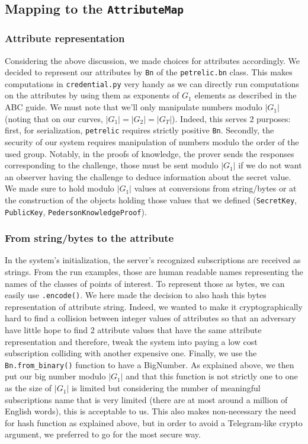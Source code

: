 \documentclass[10pt,conference,compsocconf]{IEEEtran}
\begin{document}
\subsection{Mapping to the \texttt{AttributeMap}}
\subsubsection{Attribute representation}
Considering the above discussion, we made choices for attributes accordingly. We decided to represent our attributes by \texttt{Bn} of the \texttt{petrelic.bn} class. This makes computations in \texttt{credential.py} very handy as we can directly run computations on the attributes by using them as exponents of $G_1$ elements as described in the ABC guide. We must note that we'll only manipulate numbers modulo $|G_1|$ (noting that on our curves, $|G_1|=|G_2|=|G_T|$). Indeed, this serves 2 purposes: first, for serialization, \texttt{petrelic} requires strictly positive \texttt{Bn}. Secondly, the security of our system requires manipulation of numbers modulo the order of the used group. Notably, in the proofs of knowledge, the prover sends the responses corresponding to the challenge, those must be sent modulo $|G_1|$ if we do not want an observer having the challenge to deduce information about the secret value. We made sure to hold modulo $|G_1|$ values at conversions from string/bytes or at the construction of the objects holding those values that we defined (\texttt{SecretKey}, \texttt{PublicKey}, \texttt{PedersonKnowledgeProof}).

\subsubsection{From string/bytes to the attribute}
In the system's initialization, the server's recognized subscriptions are received as strings. From the run examples, those are human readable names representing the names of the classes of points of interest. To represent those as bytes, we can easily use \texttt{.encode()}. We here made the decision to also hash this bytes representation of attribute string. Indeed, we wanted to make it cryptographically hard to find a collision between integer values of attributes so that an adversary have little hope to find 2 attribute values that have the same attribute representation and therefore, tweak the system into paying a low cost subscription colliding with another expensive one. Finally, we use the \texttt{Bn.from\_binary()} function to have a BigNumber. As explained above, we then put our big number modulo $|G_1|$ and that this function is not strictly one to one as the size of $|G_1|$ is limited but considering the number of meaningful subscriptions name that is very limited (there are at most around a million of English words\cite{noauthor_how_2020}), this is acceptable to us. This also makes non-necessary the need for hash function as explained above, but in order to avoid a Telegram-like crypto argument, we preferred to go for the most secure way. 
\end{document}
